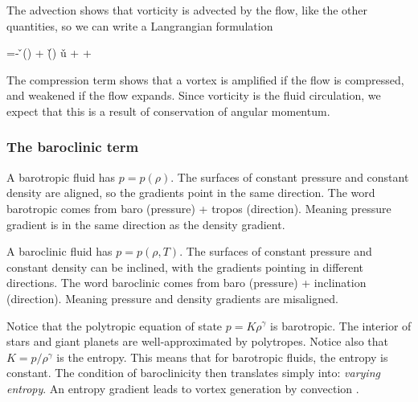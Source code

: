 The advection shows that vorticity is advected by the flow, like the
other quantities, so we can write a Langrangian formulation

\beq
{} =- \v{\omega}\left(\right) +
\left(\v{\omega}\cdot\del\right) \v{u}  +\grad{\rho} \times {} + \nu\Laplace{\v{\omega}}
\eeq

The compression term shows that a vortex is amplified if the
flow is compressed, and weakened if the flow expands. Since vorticity
is the fluid circulation, we expect that this is a result of
conservation of angular momentum. 

\subsubsection{The baroclinic term}

A barotropic fluid has $p = p(\rho)$. The surfaces of constant
pressure and constant density are aligned, so the
gradients point in the same direction.
The word barotropic comes from baro (pressure) + tropos
(direction). Meaning pressure gradient is in the same
direction as the density gradient.

A baroclinic fluid has $p = p(\rho,T)$. The surfaces of constant
pressure and constant density can be inclined, with the
gradients pointing in different directions.
The word baroclinic comes from baro (pressure) +
inclination (direction). Meaning pressure and density
gradients are misaligned.

Notice that the polytropic equation of state $p = K \rho^\gamma$ is barotropic.
The interior of stars and giant planets are well-approximated by
polytropes. Notice also that $K=p/\rho^\gamma$ is the entropy. This
means that for barotropic fluids, the entropy is constant.
The condition of baroclinicity then translates simply into: {\it varying entropy}.
An entropy gradient leads to vortex generation by convection .


